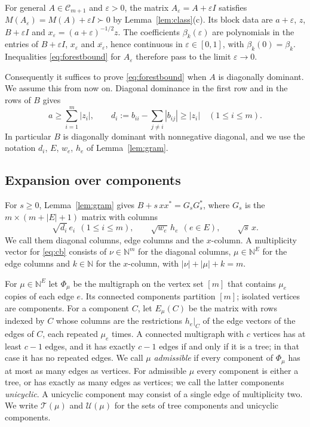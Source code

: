 \documentclass[11pt]{amsart}
\theoremstyle{remark}
\numberwithin{equation}{section}
\newcommand{\cC}{\mathcal{C}}
\newcommand{\cT}{\mathcal{T}}
\newcommand{\cU}{\mathcal{U}}
\newcommand{\N}{\mathbb{N}}
\newcommand{\conj}[1]{\overline{#1}}
\begin{document}
For general $A\in\cC_{m+1}$ and $\varepsilon>0$, the matrix $A_\varepsilon=A+\varepsilon I$ satisfies $M(A_\varepsilon)=M(A)+\varepsilon I\succ0$ by Lemma~\ref{lem:class}(c). Its block data are $a+\varepsilon$, $z$, $B+\varepsilon I$ and $x_\varepsilon=(a+\varepsilon)^{-1/2}z$. The coefficients $\beta_k(\varepsilon)$ are polynomials in the entries of $B+\varepsilon I$, $x_\varepsilon$ and $\conj{x_\varepsilon}$, hence continuous in $\varepsilon\in[0,1]$, with $\beta_k(0)=\beta_k$. Inequalities \eqref{eq:forestbound} for $A_\varepsilon$ therefore pass to the limit $\varepsilon\to0$.

Consequently it suffices to prove \eqref{eq:forestbound} when $A$ is diagonally dominant. We assume this from now on. Diagonal dominance in the first row and in the rows of $B$ gives
\begin{equation}\label{eq:dd}
a\ge\sum_{i=1}^m|z_i|,\qquad d_i:=b_{ii}-\sum_{j\ne i}|b_{ij}|\ge|z_i|\quad(1\le i\le m).
\end{equation}
In particular $B$ is diagonally dominant with nonnegative diagonal, and we use the notation $d_i$, $E$, $w_e$, $h_e$ of Lemma~\ref{lem:gram}.

\subsection{Expansion over components}\label{subsec:expansion}

For $s\ge0$, Lemma~\ref{lem:gram} gives $B+s\,xx^*=G_sG_s^*$, where $G_s$ is the $m\times(m+|E|+1)$ matrix with columns
\begin{equation}\label{eq:columns}
\sqrt{d_i}\,e_i\ \ (1\le i\le m),\qquad\sqrt{w_e}\,h_e\ \ (e\in E),\qquad\sqrt{s}\,x .
\end{equation}
We call them diagonal columns, edge columns and the $x$-column. A multiplicity vector for \eqref{eq:cb} consists of $\nu\in\N^m$ for the diagonal columns, $\mu\in\N^E$ for the edge columns and $k\in\N$ for the $x$-column, with $|\nu|+|\mu|+k=m$.

For $\mu\in\N^E$ let $\Phi_\mu$ be the multigraph on the vertex set $[m]$ that contains $\mu_e$ copies of each edge $e$. Its connected components partition $[m]$; isolated vertices are components. For a component $C$, let $E_\mu(C)$ be the matrix with rows indexed by $C$ whose columns are the restrictions $h_e|_C$ of the edge vectors of the edges of $C$, each repeated $\mu_e$ times. A connected multigraph with $c$ vertices has at least $c-1$ edges, and it has exactly $c-1$ edges if and only if it is a tree; in that case it has no repeated edges. We call $\mu$ \emph{admissible} if every component of $\Phi_\mu$ has at most as many edges as vertices. For admissible $\mu$ every component is either a tree, or has exactly as many edges as vertices; we call the latter components \emph{unicyclic}. A unicyclic component may consist of a single edge of multiplicity two. We write $\cT(\mu)$ and $\cU(\mu)$ for the sets of tree components and unicyclic components.
\end{document}
